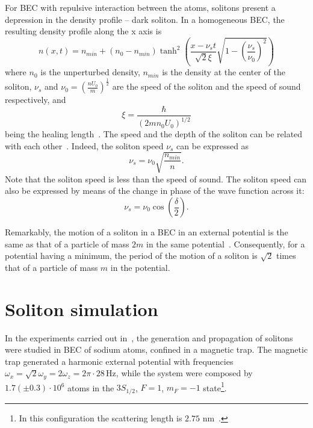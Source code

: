 For BEC with repulsive interaction between the atoms, solitons present a depression in the density profile -- dark soliton. In a homogeneous BEC, the resulting density profile along the x axis is
\begin{equation}
n(x,t) = n_{min} + \left(n_0 - n_{min}\right)\tanh^2 \left( \frac{x - \nu_s t}{\sqrt{2} \xi} \sqrt{1 - \left( \frac{\nu_s}{\nu_0} \right)^2 } \right)
\end{equation}
where $n_0$ is the unperturbed density, $n_{min}$ is the density at the center of the soliton, $\nu_s$ and  $\nu_0 = (\frac{nU_0}{m})^{\frac{1}{2}}$ are the speed of the soliton and the speed of sound respectively, and 
\begin{equation}
\xi = \frac{\hbar}{\left( 2mn_0 U_0 \right)^{1/2}}
\end{equation}
being the healing length~\citep{pethick2002bose}.
The speed and the depth of the soliton can be related with each other~\citep{RC97,JKP98}. Indeed, the soliton speed $\nu_s$ can be expressed as
\begin{equation} \label{eq:soliton-speed-density}
\nu_s = \nu_0 \sqrt{ \frac{n_{min}}{n} }.
\end{equation}
Note that the soliton speed is less than the speed of sound.
The soliton speed can also be expressed by means of the change in phase of the wave function across it:
\begin{equation}
\nu_s = \nu_0 \cos \left( \frac{\delta}{2} \right).
\end{equation}

Remarkably, the motion of a soliton in a BEC in an external potential is the same as that of a particle of mass $2m$ in the same potential~\citep{pethick2002bose}.
Consequently, for a potential having a minimum, the period of the motion of a soliton is $\sqrt{2}$ times that of a particle of mass $m$ in the potential.

\section{Soliton simulation}
In the experiments carried out in~\citep{DSF00}, the generation and propagation of solitons were studied in BEC of sodium atoms, confined in a magnetic trap. The magnetic trap generated a harmonic external potential with frequencies $\omega_x = \sqrt{2}\omega_y = 2 \omega_z = 2 \pi \cdot 28\,$Hz, while the system were composed by  $1.7 (\pm 0.3) \cdot 10^6$ atoms in the $3S_{1/2}$, $F=1$, $m_F=-1$ state\footnote{In this configuration the scattering length is $2.75$ nm~\citep{DSF00}.}. 

